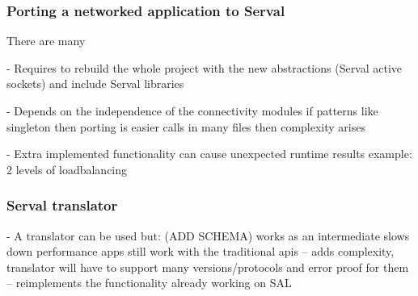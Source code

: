  
\subsubsection{Porting a networked application to Serval}
\label{sec:portingapps}
There are many 

- Requires to rebuild the whole project with the new abstractions (Serval active sockets) and include Serval libraries

- Depends on the independence of the connectivity modules
if patterns like singleton then porting is easier
calls in many files then complexity arises

- Extra implemented functionality can cause unexpected runtime results
example: 2 levels of loadbalancing


\subsubsection{Serval translator}

- A translator can be used but: (ADD SCHEMA)
works as an intermediate
slows down performance
apps still work with the traditional apis
 -- adds complexity, translator will have to support many versions/protocols and error proof for them
 -- reimplements the functionality already working on SAL